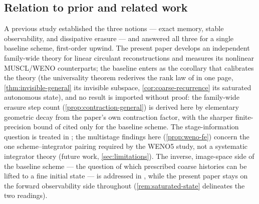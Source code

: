 \documentclass[pdflatex,sn-mathphys-num]{sn-jnl}%
\theoremstyle{thmstyleone}%
\theoremstyle{thmstyletwo}%
\theoremstyle{thmstylethree}%
\begin{document}
\subsection{Relation to prior and related work}\label{sec:relation}

A previous study \cite{PolemitisChristakisDrikakis2026FVerasure} established the three notions --- exact memory, stable observability, and dissipative erasure --- and answered all three for a single baseline scheme, first-order upwind.
The present paper develops an independent family-wide theory for linear circulant reconstructions and measures its nonlinear MUSCL/WENO counterparts; the baseline enters as the corollary that calibrates the theory (the universality theorem rederives the rank law of \cite{PolemitisChristakisDrikakis2026FVerasure} in one page, \cref{thm:invisible-general} its invisible subspace, \cref{cor:coarse-recurrence} its saturated autonomous state), and no result is imported without proof: the family-wide erasure step count (\cref{prop:contraction-general}) is derived here by elementary geometric decay from the paper's own contraction factor, with the sharper finite-precision bound of \cite{PolemitisChristakisDrikakis2026FVerasure} cited only for the baseline scheme.
The stage-information question is treated in \cite{PolemitisChristakisDrikakis2026onestep}; the multistage findings here (\cref{prop:weno-fe}) concern the one scheme--integrator pairing required by the WENO5 study, not a systematic integrator theory (future work, \cref{sec:limitations}).
The inverse, image-space side of the baseline scheme --- the question of which prescribed coarse histories can be lifted to a fine initial state --- is addressed in \cite{PolemitisChristakisDrikakis2026lifting}, while the present paper stays on the forward observability side throughout (\cref{rem:saturated-state} delineates the two readings).
\end{document}
